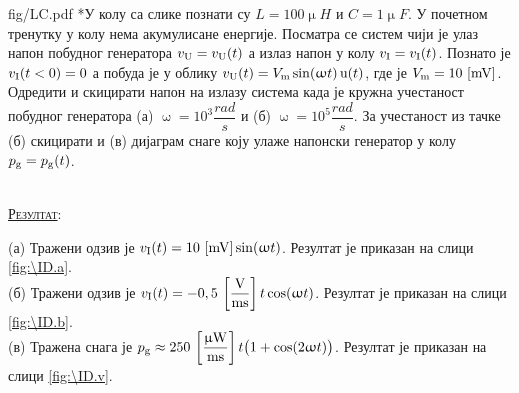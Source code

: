 \begin{slikaDesno}{fig/LC.pdf}
{\color{red}*}\PID  У колу са слике познати су 
$L = 100\unit{\upmu H}$ и $C = 1\unit{\upmu F}$.
У почетном тренутку у колу нема 
акумулисане енергије. Посматра
се систем чији је улаз напон побудног генератора $v_{\rm U} = v_{\rm U}(t)$ а излаз напон у колу 
$v_{\rm I} = v_{\rm I}(t)$. 
Познато је $v_{\rm I}(t < 0) = 0$ а побуда
је у облику $v_{\rm U}(t) = V_{\rm m} 
\sin(\upomega t)\,{\rm u}(t)$, где је 
$V_{\rm m} = 10\,\left[\mathrm{mV}\right]$. Одредити 
и скицирати напон на 
излазу система када је кружна учестаност 
побудног генератора (а) $\upomega = 10^3 
\unit{\dfrac{rad}{s}}$ и (б) 
$\upomega = 10^5 
\unit{\dfrac{rad}{s}}$. За учестаност из 
тачке (б) скицирати и (в) дијаграм снаге 
коју улаже напонски генератор у колу
$p_{\rm g} =p_{\rm g}(t)$.
\end{slikaDesno}\\

\textsc{\underline{Резултат}}:

(а) Тражени одзив је $v_{\rm I}(t) = 10\,\left[\mathrm{mV}\right] \sin(\upomega t)$. 
Резултат је приказан на слици \ref{fig:\ID.a}.\\[2mm]

(б) Тражени одзив је $v_{\rm I}(t) = -0,5\,\left[\mathrm{\dfrac{V}{ms}}\right] t \cos(\upomega t)$.
Резултат је приказан на слици \ref{fig:\ID.b}.\\[2mm]

(в) Тражена снага је $p_{\rm g} \approx 250\,\left[\mathrm{\dfrac{\upmu W}{ms}}\right] t
\bigl(1 + \cos(2\upomega t) \bigr)$.
Резултат је приказан на слици \ref{fig:\ID.v}. \\

